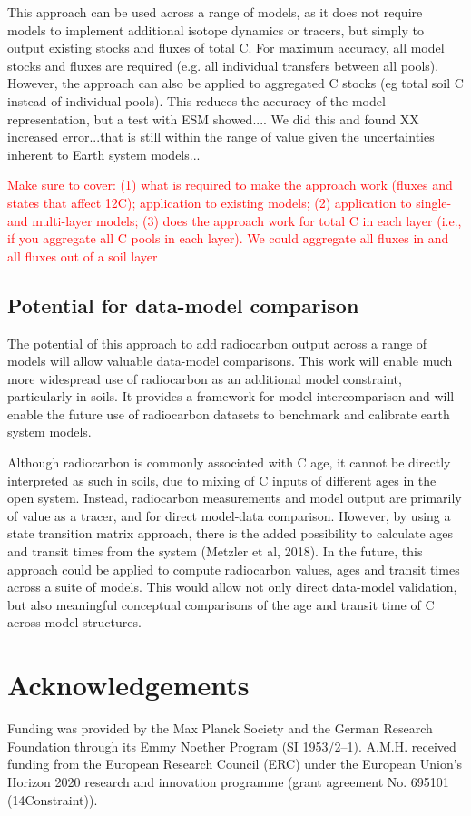 \documentclass[11pt,a4paper]{article}
\newcommand{\red}[1]{\textcolor{red}{#1}}
\begin{document}
This approach can be used across a range of models, as it does not require models to implement additional isotope dynamics or tracers, but simply to output existing stocks and fluxes of total C. For maximum accuracy, all model stocks and fluxes are required (e.g. all individual transfers between all pools). However, the approach can also be applied to aggregated C stocks (eg total soil C instead of individual pools). This reduces the accuracy of the model representation, but a test with ESM showed.... We did this and found XX increased error...that is still within the range of value given the uncertainties inherent to Earth system models...

\red{Make sure to cover: (1) what is required to make the approach work (fluxes and states that affect 12C); application to existing models; (2) application to single- and multi-layer models; (3) does the approach work for total C in each layer (i.e., if you aggregate all C pools in each layer). We could aggregate all fluxes in and all fluxes out of a soil layer}

\subsection{Potential for data-model comparison}

The potential of this approach to add radiocarbon output across a range of models will allow valuable data-model comparisons. This work will enable much more widespread use of radiocarbon as an additional model constraint, particularly in soils. It provides a framework for model intercomparison and will enable the future use of radiocarbon datasets to benchmark and calibrate earth system models.

Although radiocarbon is commonly associated with C age, it cannot be directly interpreted as such in soils, due to mixing of C inputs of different ages in the open system. Instead, radiocarbon measurements and model output are primarily of value as a tracer, and for direct model-data comparison. However, by using a state transition matrix approach, there is the added possibility to calculate ages and transit times from the system (Metzler et al, 2018). In the future, this approach could be applied to compute radiocarbon values, ages and transit times across a suite of models. This would allow not only direct data-model validation, but also meaningful conceptual comparisons of the age and transit time of C across model structures. 


\section*{Acknowledgements}
Funding was provided by the Max Planck Society and the German Research Foundation through its Emmy Noether Program (SI 1953/2--1). A.M.H. received funding from the European Research Council (ERC) under the European Union’s Horizon 2020 research and innovation programme (grant agreement No. 695101 (14Constraint)).   

%
%
%
\end{document}
